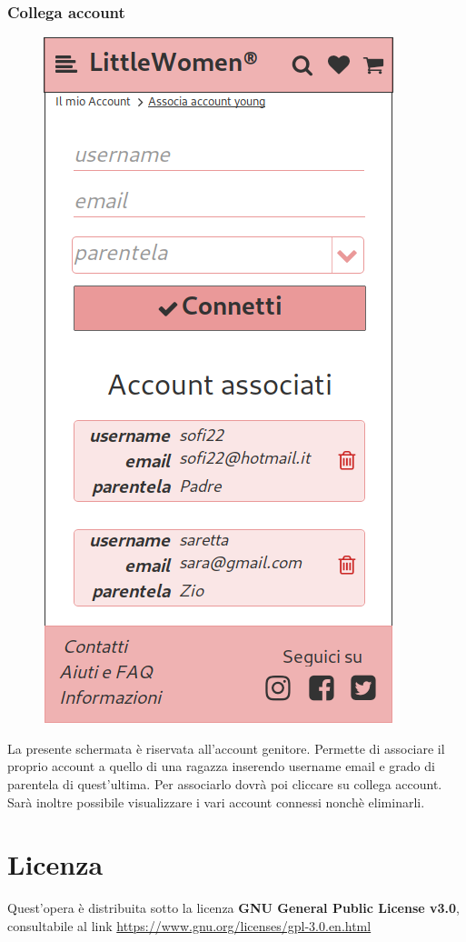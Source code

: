 \documentclass[12pt,a4paper]{report}
\begin{document}
\subsection{Collega account}
\begin{figure}
\centering
\includegraphics[height=0.4\textheight]{"Project Management Sources/Wireframe/WireFrame Screenshot/Mobile/Dettagli account"}
\end{figure}
La presente schermata è riservata all'account genitore. Permette di associare il proprio account a quello di una ragazza inserendo username email e grado di parentela di quest'ultima. Per associarlo dovrà poi cliccare su collega account. Sarà inoltre possibile visualizzare i vari account connessi nonchè eliminarli.
\chapter{Licenza}
Quest'opera è distribuita sotto la licenza \textbf{GNU General Public License v3.0}, consultabile al link  \textcolor{blue}{\href{https://www.gnu.org/licenses/gpl-3.0.en.html}{https://www.gnu.org/licenses/gpl-3.0.en.html}}
\end{document}
